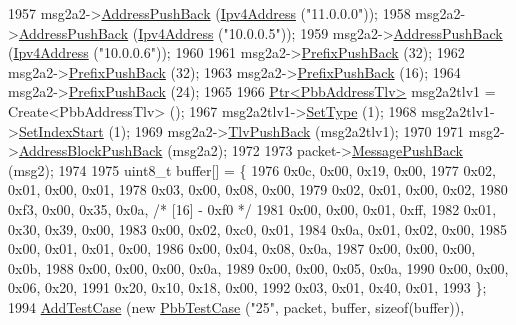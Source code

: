 \begin{DoxyCode}
1957     msg2a2->\hyperlink{classns3_1_1PbbAddressBlock_a7be545a53d69bd426dbebcf752ed8371}{AddressPushBack} (\hyperlink{classns3_1_1Ipv4Address}{Ipv4Address} (\textcolor{stringliteral}{"11.0.0.0"}));
1958     msg2a2->\hyperlink{classns3_1_1PbbAddressBlock_a7be545a53d69bd426dbebcf752ed8371}{AddressPushBack} (\hyperlink{classns3_1_1Ipv4Address}{Ipv4Address} (\textcolor{stringliteral}{"10.0.0.5"}));
1959     msg2a2->\hyperlink{classns3_1_1PbbAddressBlock_a7be545a53d69bd426dbebcf752ed8371}{AddressPushBack} (\hyperlink{classns3_1_1Ipv4Address}{Ipv4Address} (\textcolor{stringliteral}{"10.0.0.6"}));
1960 
1961     msg2a2->\hyperlink{classns3_1_1PbbAddressBlock_a8e6f539ccffd043a2890396d882d0a42}{PrefixPushBack} (32);
1962     msg2a2->\hyperlink{classns3_1_1PbbAddressBlock_a8e6f539ccffd043a2890396d882d0a42}{PrefixPushBack} (32);
1963     msg2a2->\hyperlink{classns3_1_1PbbAddressBlock_a8e6f539ccffd043a2890396d882d0a42}{PrefixPushBack} (16);
1964     msg2a2->\hyperlink{classns3_1_1PbbAddressBlock_a8e6f539ccffd043a2890396d882d0a42}{PrefixPushBack} (24);
1965 
1966     \hyperlink{classns3_1_1Ptr}{Ptr<PbbAddressTlv>} msg2a2tlv1 = Create<PbbAddressTlv> ();
1967     msg2a2tlv1->\hyperlink{classns3_1_1PbbTlv_a90a0452018ed364ac37c3ad116dd718b}{SetType} (1);
1968     msg2a2tlv1->\hyperlink{classns3_1_1PbbAddressTlv_a82d685ae4e4e2f6d2532cb212f5b2797}{SetIndexStart} (1);
1969     msg2a2->\hyperlink{classns3_1_1PbbAddressBlock_a6e33cd1452dd3ff753de3e3c99e473a5}{TlvPushBack} (msg2a2tlv1);
1970 
1971     msg2->\hyperlink{classns3_1_1PbbMessage_a5f623bad2fb1adde7da885e1c92d5311}{AddressBlockPushBack} (msg2a2);
1972 
1973     packet->\hyperlink{classns3_1_1PbbPacket_a4a3170001ef758d9c9c4375b8f089826}{MessagePushBack} (msg2);
1974 
1975     uint8\_t buffer[] = \{
1976       0x0c, 0x00, 0x19, 0x00,
1977       0x02, 0x01, 0x00, 0x01,
1978       0x03, 0x00, 0x08, 0x00,
1979       0x02, 0x01, 0x00, 0x02,
1980       0xf3, 0x00, 0x35, 0x0a,   \textcolor{comment}{/* [16] - 0xf0 */}
1981       0x00, 0x00, 0x01, 0xff,
1982       0x01, 0x30, 0x39, 0x00,
1983       0x00, 0x02, 0xc0, 0x01,
1984       0x0a, 0x01, 0x02, 0x00,
1985       0x00, 0x01, 0x01, 0x00,
1986       0x00, 0x04, 0x08, 0x0a,
1987       0x00, 0x00, 0x00, 0x0b,
1988       0x00, 0x00, 0x00, 0x0a,
1989       0x00, 0x00, 0x05, 0x0a,
1990       0x00, 0x00, 0x06, 0x20,
1991       0x20, 0x10, 0x18, 0x00,
1992       0x03, 0x01, 0x40, 0x01,
1993     \};
1994     \hyperlink{classns3_1_1TestCase_a3718088e3eefd5d6454569d2e0ddd835}{AddTestCase} (\textcolor{keyword}{new} \hyperlink{classPbbTestCase}{PbbTestCase} (\textcolor{stringliteral}{"25"}, packet, buffer, \textcolor{keyword}{sizeof}(buffer)), 

\end{DoxyCode}

